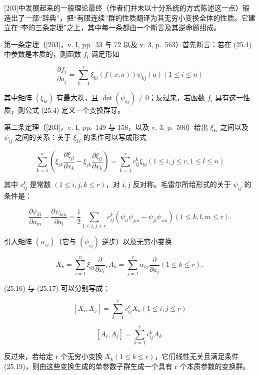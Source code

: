 {[}203{]}中发展起来的一般理论最终（作者们并未以十分系统的方式陈述这一点）锻造出了一部“辞典”，把“有限连续”群的性质翻译为其无穷小变换全体的性质。它建立在“李的三条定理”之上，其中每一条都由一个断言及其逆命题组成。

第一条定理（{[}203{]}，v. I, pp.~33 与 72 以及 v. 3, p.~563）首先断言：若在 (25.4) 中参数是本质的，则函数 \(f_{i}\) 满足形如

\[
\frac {\partial f _ {i}}{\partial a _ {j}} = \sum_ {k = 1} ^ {r} \xi_ {k i} (f (x, a)) \psi_ {k j} (a) (1 \leq i \leq n)\tag{25.15}
\]

其中矩阵 \((\xi_{kl})\) 有最大秩，且 \(\det(\psi_{kj}) \neq 0\)；反过来，若函数 \(f_{i}\) 具有这一性质，则公式 (25.4) 定义一个变换群芽。

第二条定理（{[}203{]}，v. I, pp.~149 与 158，以及 v. 3, p.~590）给出 \(\xi_{ki}\) 之间以及 \(\psi_{ij}\) 之间的关系：关于 \(\xi_{ki}\) 的条件可以写成形式

\[
\sum_ {k = 1} ^ {n} \left(\xi_ {i k} \frac {\partial \xi_ {j l}}{\partial x _ {k}} - \xi_ {j k} \frac {\partial \xi_ {i l}}{\partial x _ {k}}\right) = \sum_ {k = 1} ^ {r} c _ {i j} ^ {k} \xi_ {k l} (1 \leq i, j \leq r, 1 \leq l \leq n)\tag{25.16}
\]

其中 \(c_{ij}^{k}\) 是常数 \((1 \leq i, j, k \leq r)\)，对 i, j 反对称。毛雷尔所给形式的关于 \(\psi_{ij}\) 的条件是：

\[
\frac {\partial \psi_ {k l}}{\partial a _ {m}} - \frac {\partial \psi_ {k m}}{\partial a _ {l}} = \frac {1}{2} \sum_ {1 \leq i, j \leq r} c _ {i j} ^ {k} (\psi_ {i l} \psi_ {j m} - \psi_ {j l} \psi_ {i m}) (1 \leq k, l, m \leq r).\tag{25.17}
\]

引入矩阵 \((\alpha_{ij})\)（它与 \((\psi_{ij})\) 逆步）以及无穷小变换

\[
X _ {k} = \sum_ {i = 1} ^ {n} \xi_ {k i} \frac {\partial}{\partial x _ {i}}, A _ {k} = \sum_ {j = 1} ^ {r} \alpha_ {k j} \frac {\partial}{\partial a _ {j}} (1 \leq k \leq r),\tag{25.18}
\]

(25.16) 与 (25.17) 可以分别写成：

\[
[ X _ {i}, X _ {j} ] = \sum_ {k = 1} ^ {r} c _ {i j} ^ {k} X _ {k} (1 \leq i, j \leq r)\tag{25.19}
\]

\[
\left[ A _ {i}, A _ {j} \right] = \sum_ {k = 1} ^ {r} c _ {i j} ^ {k} A _ {k}.\tag{25.20}
\]

反过来，若给定 r 个无穷小变换 \(X_{k}(1 \leq k \leq r)\)，它们线性无关且满足条件 (25.19)，则由这些变换生成的单参数子群生成一个具有 r 个本质参数的变换群。

